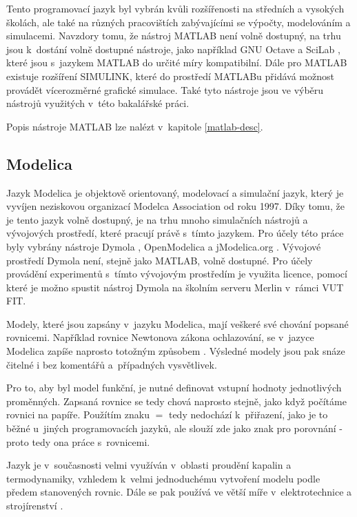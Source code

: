 Tento programovací jazyk byl vybrán kvůli rozšířenosti na středních a vysokých školách, ale také na různých pracovištích zabývajícími se výpočty, modelováním a simulacemi. Navzdory tomu, že nástroj MATLAB není volně dostupný, na trhu jsou k~dostání volně dostupné nástroje, jako například GNU Octave \cite{OctaveManual} a SciLab \cite{scilab}, které jsou s~jazykem MATLAB do určité míry kompatibilní. Dále pro MATLAB existuje rozšíření SIMULINK, které do prostředí MATLABu přidává možnost provádět vícerozměrné grafické simulace. Také tyto nástroje jsou ve výběru nástrojů využitých v~této bakalářské práci.

Popis nástroje MATLAB lze nalézt v~kapitole \ref{matlab-desc}.
\subsection*{Modelica}
\label{modelica-lang}
Jazyk Modelica je objektově orientovaný, modelovací a simulační jazyk, který je vyvíjen neziskovou organizací Modelca Association od roku 1997. Díky tomu, že je tento jazyk volně dostupný, je na trhu mnoho simulačních nástrojů a vývojových prostředí, které pracují právě s~tímto jazykem. Pro účely této práce byly vybrány nástroje Dymola \cite{Fritzson02modelica--}, OpenModelica \cite{Fritzson02modelica--} a jModelica.org \cite{jmodelica}. Vývojové prostředí Dymola není, stejně jako MATLAB, volně dostupné. Pro účely provádění experimentů s~tímto vývojovým prostředím je využita licence, pomocí které je možno spustit nástroj Dymola na školním serveru Merlin v~rámci VUT FIT.

Modely, které jsou zapsány v~jazyku Modelica, mají veškeré své chování popsané rovnicemi. Například rovnice Newtonova zákona ochlazování, se v~jazyce Modelica zapíše naprosto totožným způsobem \cite{modelica-example}. Výsledné modely jsou pak snáze čitelné i bez komentářů a~případných vysvětlivek.

Pro to, aby byl model funkční, je nutné definovat vstupní hodnoty jednotlivých proměnných. Zapsaná rovnice se tedy chová naprosto stejně, jako když počítáme rovnici na papíře. Použítím znaku $ = $ tedy nedochází k~přiřazení, jako je to běžné u~jiných programovacích jazyků, ale slouží zde jako znak pro porovnání - proto tedy ona práce s~rovnicemi.

Jazyk je v~současnosti velmi využíván v~oblasti proudění kapalin a termodynamiky, vzhledem k~velmi jednoduchému vytvoření modelu podle předem stanovených rovnic. Dále se pak používá ve větší míře v~elektrotechnice a strojírenství \cite{modelica-example}.

